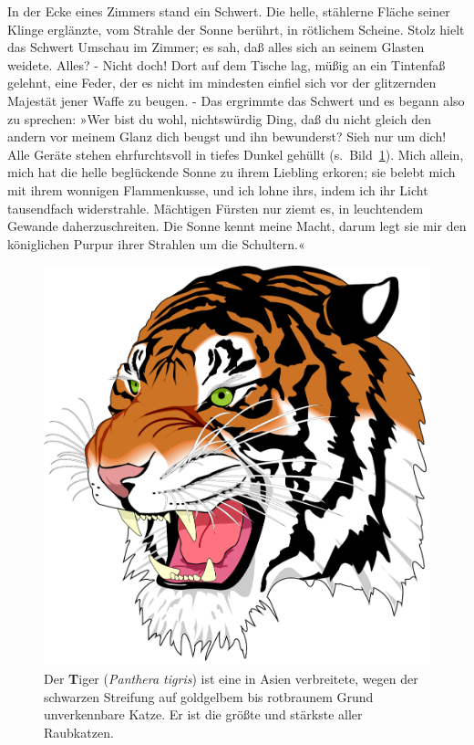 In der Ecke eines Zimmers stand ein Schwert. Die helle, stählerne Fläche seiner
Klinge erglänzte, vom Strahle der Sonne berührt, in rötlichem Scheine. Stolz
hielt das Schwert Umschau im Zimmer; es sah, daß alles sich an seinem Glasten
weidete. Alles? - Nicht doch! Dort auf dem Tische lag, müßig an ein Tintenfaß \cite{btt:1998}
gelehnt, eine Feder, der es nicht im mindesten einfiel sich vor der
glitzernden Majestät jener Waffe zu beugen. - Das ergrimmte das Schwert und es
begann also zu sprechen: »Wer bist du wohl, nichtswürdig Ding, daß du nicht
gleich den andern vor meinem Glanz dich beugst und ihn bewunderst? Sieh nur
um dich! Alle Geräte stehen ehrfurchtsvoll in tiefes Dunkel gehüllt (s.\ Bild~\ref{fig:bild1}). Mich
allein, mich hat die helle beglückende Sonne zu ihrem Liebling erkoren; sie
belebt mich mit ihrem wonnigen Flammenkusse, und ich lohne ihrs, indem ich ihr
Licht tausendfach widerstrahle. Mächtigen Fürsten nur ziemt es, in leuchtendem
Gewande daherzuschreiten. Die Sonne kennt meine Macht, darum legt sie mir den
königlichen Purpur ihrer Strahlen um die Schultern.«

\begin{figure}[t]\centering
  \includegraphics[width = 120mm]{bilder/DemoFile_tiger}
  \caption{Der {\textbf Tiger} ({\em Panthera tigris}) ist eine in Asien
           verbreitete, wegen der schwarzen Streifung auf goldgelbem bis
	   rotbraunem Grund unverkennbare Katze. Er ist die größte und
	   stärkste aller Raubkatzen.}\label{fig:bild1}
\end{figure}

